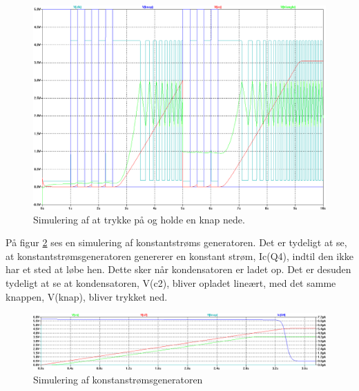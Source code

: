 \begin{figure}[h]
\centering
\includegraphics[width=\textwidth]{teknisk/volumenkontrol/stress-test.png}
\caption{Simulering af at trykke på og holde en knap nede.}
\label{fig:stresstest}
\end{figure}

På figur \ref{fig:konstantstroem} ses en simulering af konstantstrøms generatoren. Det er tydeligt at se, at konstantstrømsgeneratoren genererer en konstant strøm, Ic(Q4), indtil den ikke har et sted at løbe hen. Dette sker når kondensatoren er ladet op. Det er desuden tydeligt at se at kondensatoren, V(c2), bliver opladet lineært, med det samme knappen, V(knap), bliver trykket ned. 

\begin{figure}[h]
\centering
\includegraphics[width=\textwidth]{teknisk/volumenkontrol/konstantstroem.png}
\caption{Simulering af konstanstrømsgeneratoren}
\label{fig:konstantstroem}
\end{figure}

